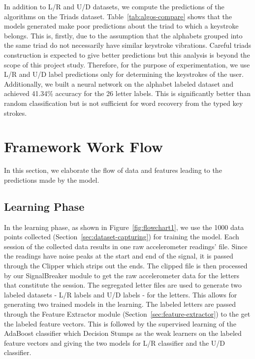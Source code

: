 \documentclass[11pt,conference]{IEEEtran}
\begin{document}
In addition to L/R and U/D datasets, we compute the predictions of the algorithms on the Triads dataset. Table~\ref{tab:algos-compare} shows that the models generated make poor predictions about the triad to which a keystroke belongs. This is, firstly, due to the assumption that the alphabets grouped into the same triad do not necessarily have similar keystroke vibrations. Careful triads construction is expected to give better predictions but this analysis is beyond the scope of this project study. Therefore, for the purpose of experimentation, we use L/R and U/D label predictions only for determining the keystrokes of the user. Additionally, we built a neural network on the alphabet labeled dataset and achieved 41.34\% accuracy for the 26 letter labels. This is significantly better than random classification but is not sufficient for word recovery from the typed key strokes.

\section{Framework Work Flow}
\label{sec:framework}
In this section, we elaborate the flow of data and features leading to the
predictions made by the model.
\subsection{Learning Phase}
\label{sec:learning}
In the learning phase, as shown in Figure~\ref{fig:flowchart1}, we use the 1000 data points collected (Section~\ref{sec:dataset-capturing})
for training the model. Each session of the collected data results in one raw accelerometer readings' file.
Since the readings have noise peaks at the start and end of the signal, it is passed through the Clipper
which strips out the ends. The clipped file is then processed by our SignalBreaker module to
get the raw accelerometer data for the letters that constitute the session. The segregated letter files are used
to generate two labeled datasets - L/R labels and U/D labels - for the letters. This allows for generating two
trained models in the learning. The labeled letters are passed through the Feature Extractor module
(Section~\ref{sec:feature-extractor}) to the get the labeled
feature vectors. This is followed by the supervised learning of the AdaBoost classifier which Decision Stumps
as the weak learners on the labeled feature vectors and giving the two models for L/R classifier and
the U/D classifier.
\end{document}
